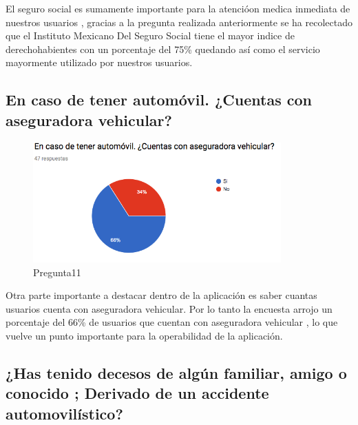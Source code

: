 El seguro social es sumamente importante para la atencióon medica inmediata de nuestros usuarios , gracias a la pregunta realizada anteriormente se ha recolectado que el Instituto Mexicano Del Seguro Social tiene el mayor indice de derechohabientes con un porcentaje del 75\%  quedando así como el servicio mayormente utilizado por nuestros usuarios.  

\subsection{En caso de tener automóvil. ¿Cuentas con aseguradora vehicular?}

\begin{figure}[htbp!]
	\begin{center}
		\includegraphics[width=0.85\textwidth]{DisenoEstructura/imagenes/Pregunta11}
		\caption{Pregunta11}
		\label{DE/FO/Pregunta11}
	\end{center}
\end{figure}

Otra parte importante a destacar dentro de la aplicación es saber cuantas usuarios cuenta con aseguradora vehicular. Por lo tanto la encuesta arrojo un porcentaje del 66\% de usuarios que cuentan con aseguradora vehicular , lo que vuelve un punto importante para la operabilidad de la aplicación.\\

\subsection{¿Has tenido decesos de algún familiar, amigo o conocido ; Derivado de un accidente automovilístico?}

